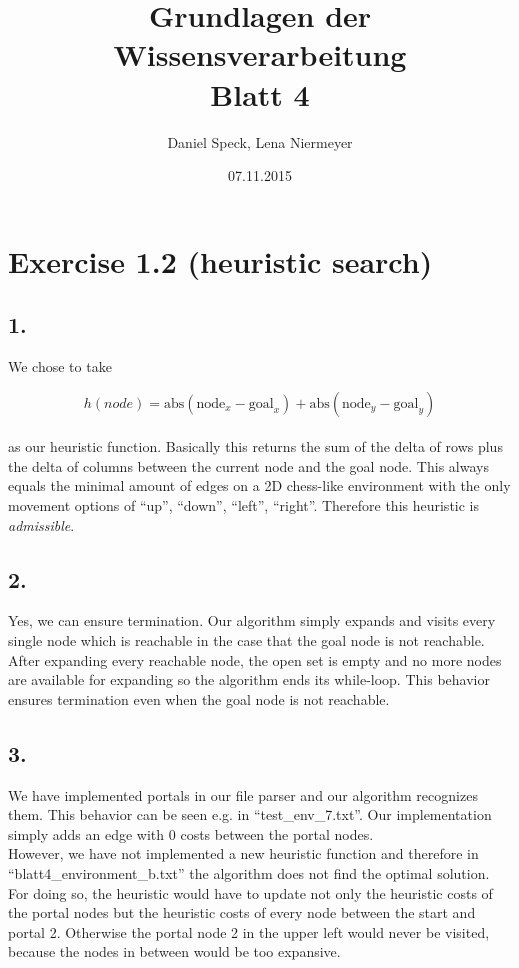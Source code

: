 \documentclass[10pt,a4paper]{article}
\title{\textbf{\huge Grundlagen der Wissensverarbeitung
\\\Large Blatt 4}}
\author{Daniel Speck, Lena Niermeyer}
\date{07.11.2015}
\begin{document}
	\maketitle
	
	
	\section*{Exercise 1.2 (heuristic search)}

		\subsection*{1.}
		
			We chose to take
			
			\begin{equation*}
				h(node) = 
				\text{abs}(\text{node}_x - \text{goal}_x)
				+
				\text{abs}(\text{node}_y - \text{goal}_y)
			\end{equation*}
			\\
			\noindent as our heuristic function. Basically this returns the sum of the delta of rows plus the delta of columns between the current node and the goal node. This always equals the minimal amount of edges on a 2D chess-like environment with the only movement options of \enquote{up}, \enquote{down}, \enquote{left}, \enquote{right}. Therefore this heuristic is \textit{admissible}.
		
			
		\subsection*{2.}
		
			Yes, we can ensure termination. Our algorithm simply expands and visits every single node which is reachable in the case that the goal node is not reachable. After expanding every reachable node, the open set is empty and no more nodes are available for expanding so the algorithm ends its while-loop. This behavior ensures termination even when the goal node is not reachable.
			
			
		\subsection*{3.}
		
			We have implemented portals in our file parser and our algorithm recognizes them. This behavior can be seen e.g. in \enquote{test\_env\_7.txt}. Our implementation simply adds an edge with 0 costs between the portal nodes.
			\\
			However, we have not implemented a new heuristic function and therefore in \enquote{blatt4\_environment\_b.txt} the algorithm does not find the optimal solution. For doing so, the heuristic would have to update not only the heuristic costs of the portal nodes but the heuristic costs of every node between the start and portal 2. Otherwise the portal node 2 in the upper left would never be visited, because the nodes in between would be too expansive.
			
\end{document}
